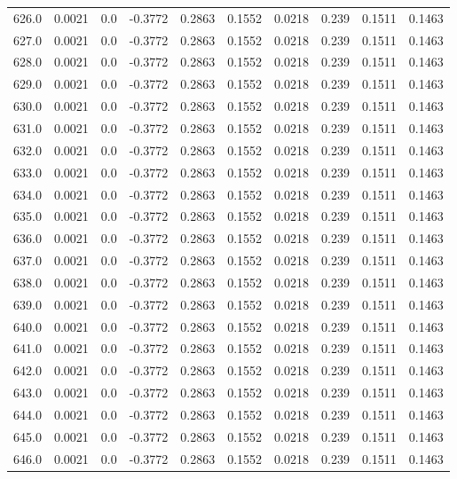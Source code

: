 \begin{longtable}{lrrrrrrrrr}
626.0 & 0.0021 & 0.0 & -0.3772 & 0.2863 & 0.1552 & 0.0218 & 0.239 & 0.1511 & 0.1463 \\
627.0 & 0.0021 & 0.0 & -0.3772 & 0.2863 & 0.1552 & 0.0218 & 0.239 & 0.1511 & 0.1463 \\
628.0 & 0.0021 & 0.0 & -0.3772 & 0.2863 & 0.1552 & 0.0218 & 0.239 & 0.1511 & 0.1463 \\
629.0 & 0.0021 & 0.0 & -0.3772 & 0.2863 & 0.1552 & 0.0218 & 0.239 & 0.1511 & 0.1463 \\
630.0 & 0.0021 & 0.0 & -0.3772 & 0.2863 & 0.1552 & 0.0218 & 0.239 & 0.1511 & 0.1463 \\
631.0 & 0.0021 & 0.0 & -0.3772 & 0.2863 & 0.1552 & 0.0218 & 0.239 & 0.1511 & 0.1463 \\
632.0 & 0.0021 & 0.0 & -0.3772 & 0.2863 & 0.1552 & 0.0218 & 0.239 & 0.1511 & 0.1463 \\
633.0 & 0.0021 & 0.0 & -0.3772 & 0.2863 & 0.1552 & 0.0218 & 0.239 & 0.1511 & 0.1463 \\
634.0 & 0.0021 & 0.0 & -0.3772 & 0.2863 & 0.1552 & 0.0218 & 0.239 & 0.1511 & 0.1463 \\
635.0 & 0.0021 & 0.0 & -0.3772 & 0.2863 & 0.1552 & 0.0218 & 0.239 & 0.1511 & 0.1463 \\
636.0 & 0.0021 & 0.0 & -0.3772 & 0.2863 & 0.1552 & 0.0218 & 0.239 & 0.1511 & 0.1463 \\
637.0 & 0.0021 & 0.0 & -0.3772 & 0.2863 & 0.1552 & 0.0218 & 0.239 & 0.1511 & 0.1463 \\
638.0 & 0.0021 & 0.0 & -0.3772 & 0.2863 & 0.1552 & 0.0218 & 0.239 & 0.1511 & 0.1463 \\
639.0 & 0.0021 & 0.0 & -0.3772 & 0.2863 & 0.1552 & 0.0218 & 0.239 & 0.1511 & 0.1463 \\
640.0 & 0.0021 & 0.0 & -0.3772 & 0.2863 & 0.1552 & 0.0218 & 0.239 & 0.1511 & 0.1463 \\
641.0 & 0.0021 & 0.0 & -0.3772 & 0.2863 & 0.1552 & 0.0218 & 0.239 & 0.1511 & 0.1463 \\
642.0 & 0.0021 & 0.0 & -0.3772 & 0.2863 & 0.1552 & 0.0218 & 0.239 & 0.1511 & 0.1463 \\
643.0 & 0.0021 & 0.0 & -0.3772 & 0.2863 & 0.1552 & 0.0218 & 0.239 & 0.1511 & 0.1463 \\
644.0 & 0.0021 & 0.0 & -0.3772 & 0.2863 & 0.1552 & 0.0218 & 0.239 & 0.1511 & 0.1463 \\
645.0 & 0.0021 & 0.0 & -0.3772 & 0.2863 & 0.1552 & 0.0218 & 0.239 & 0.1511 & 0.1463 \\
646.0 & 0.0021 & 0.0 & -0.3772 & 0.2863 & 0.1552 & 0.0218 & 0.239 & 0.1511 & 0.1463 \\

\end{longtable}
